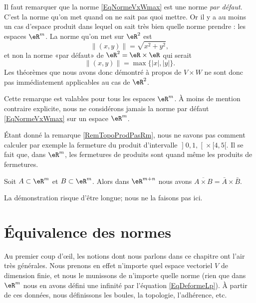 \begin{remark}		\label{RemTopoProdPasRm}
	Il faut remarquer que la norme \eqref{EqNormeVxWmax} est une norme \emph{par défaut}. C'est la norme qu'on met quand on ne sait pas quoi mettre. Or il y a au moins un cas d'espace produit dans lequel on sait très bien quelle norme prendre : les espaces $\eR^m$. La norme qu'on met sur $\eR^2$ est
	\begin{equation}
		\| (x,y) \|=\sqrt{x^2+y^2},
	\end{equation}
	et non la norme «par défaut» de $\eR^2=\eR\times\eR$ qui serait
	\begin{equation}
		\| (x,y) \|=\max\{ | x |,| y | \}.
	\end{equation}
	Les théorèmes que nous avons donc démontré à propos de $V\times W$ ne sont donc pas immédiatement applicables au cas de $\eR^2$.

	Cette remarque est valables pour tous les espaces $\eR^m$. À moins de mention contraire explicite, nous ne considérons jamais la norme par défaut \eqref{EqNormeVxWmax} sur un espace $\eR^m$.
\end{remark}

Étant donné la remarque \ref{RemTopoProdPasRm}, nous ne savons pas comment calculer par exemple la fermeture du produit d'intervalle $\mathopen] 0,1 ,  \mathclose[\times\mathopen[ 4 , 5 [$. Il se fait que, dans $\eR^m$, les fermetures de produits sont quand même les produits de fermetures.

\begin{proposition}		\label{PropovlAxBbarAbraB}
	Soit $A\subset\eR^m$ et $B\subset\eR^m$. Alors dans $\eR^{m+n}$ nous avons $\overline{ A\times B }=\bar A\times \bar B$.
\end{proposition}

La démonstration risque d'être longue; nous ne la faisons pas ici.

\section{Équivalence des normes}
\label{normes_equiv}

Au premier coup d'œil, les notions dont nous parlons dans ce chapitre ont l'air très générales. Nous prenons en effet n'importe quel espace vectoriel $V$ de dimension finie, et nous le munissons de n'importe quelle norme (rien que dans $\eR^m$ nous en avons défini une infinité par l'équation \eqref{EqDeformeLp}). À partir de ces données, nous définissons les boules, la topologie, l'adhérence, etc.


